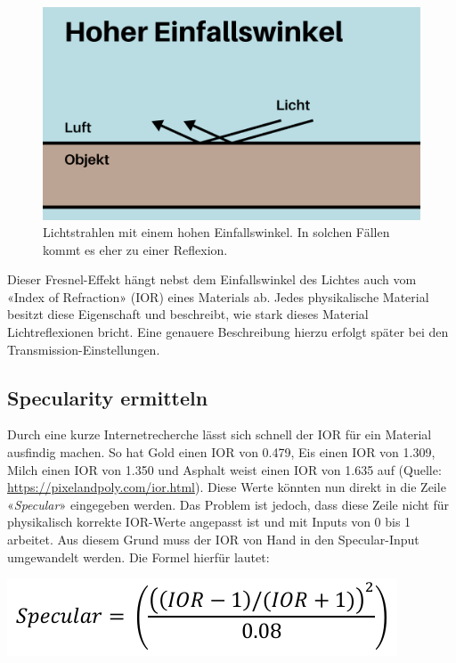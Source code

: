 \documentclass[
]{book}
\let\oldmarginnote\marginnote
\renewcommand{\marginnote}[1]{%
  \oldmarginnote{{\footnotesize\selectfont #1}}%
}
\begin{document}
\begin{figure}

\includegraphics{Chapters/Images/Chapter_31/31_4_High_Angle.png}

\caption{\label{fig-1_4}Lichtstrahlen mit einem hohen Einfallswinkel. In
solchen Fällen kommt es eher zu einer Reflexion.}

\end{figure}%

\marginnote{IOR}

Dieser Fresnel-Effekt hängt nebst dem Einfallswinkel des Lichtes auch
vom «Index of Refraction» (IOR) eines Materials ab. Jedes physikalische
Material besitzt diese Eigenschaft und beschreibt, wie stark dieses
Material Lichtreflexionen bricht. Eine genauere Beschreibung hierzu
erfolgt später bei den Transmission-Einstellungen.

\subsection{Specularity ermitteln}\label{specularity-ermitteln}

\marginnote{IOR berechnen}

Durch eine kurze Internetrecherche lässt sich schnell der IOR für ein
Material ausfindig machen. So hat Gold einen IOR von 0.479, Eis einen
IOR von 1.309, Milch einen IOR von 1.350 und Asphalt weist einen IOR von
1.635 auf (Quelle: \url{https://pixelandpoly.com/ior.html}). Diese Werte
könnten nun direkt in die Zeile «\emph{Specular}» eingegeben werden. Das
Problem ist jedoch, dass diese Zeile nicht für physikalisch korrekte
IOR-Werte angepasst ist und mit Inputs von 0 bis 1 arbeitet. Aus diesem
Grund muss der IOR von Hand in den Specular-Input umgewandelt werden.
Die Formel hierfür lautet:

\includegraphics{Chapters/Images/Chapter_31/Formula.png}\hfill
\end{document}
